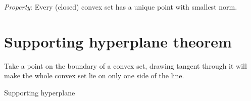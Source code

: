 \documentclass{tufte-handout}
\theoremstyle{remark}
\begin{document}
\textit{Property}: Every (closed) convex set has a unique point with smallest norm.\\

\section{Supporting hyperplane theorem}
Take a point on the boundary of a convex set, drawing tangent through it will make the whole convex set lie on only one side of the line.
\begin{marginfigure}
\caption{Supporting hyperplane}
\end{marginfigure}
\end{document}
